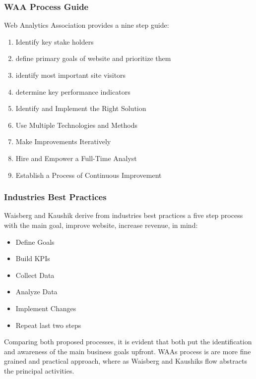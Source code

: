 \subsubsection{WAA Process Guide}
Web Analytics Association provides a nine step guide:%
\begin{enumerate}
\item Identify key stake holders
\item define primary goals of website and prioritize them
\item identify most important site visitors
\item determine key performance indicators
\item Identify and Implement the Right Solution
\item Use Multiple Technologies and Methods
\item Make Improvements Iteratively
\item Hire and Empower a Full-Time Analyst
\item Establish a Process of Continuous Improvement
\end{enumerate}



\subsubsection{Industries Best Practices}

Waisberg and Kaushik derive from industries best practices a five step process with the main goal, improve website, increase revenue, in mind:%

\begin{itemize}
\item Define Goals
\item Build KPIs
\item Collect Data
\item Analyze Data
\item Implement Changes
\item Repeat last two steps
\end{itemize}


Comparing both proposed processes, it is evident that both put the identification and awareness of the main business goals upfront.
WAAs process is are more fine grained and practical approach, where as Waisberg and Kaushiks flow abstracts the principal activities.





